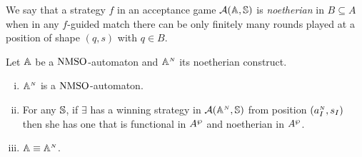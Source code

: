 \begin{definition}\label{def:noetherianstrategy}
We say that a strategy $f$ in an acceptance game $\mathcal{A}(\mathbb{A},\mathbb{S})$ is \emph{noetherian} in $B \subseteq A$ when in any $f$-guided match there can be only finitely many rounds played at a position of shape $(q,s)$ with $q \in B$.
\end{definition}


\begin{proposition}\label{PROP_facts_finConstr} Let $\mathbb{A}$ be a $\mathrm{NMSO}$-automaton and $\mathbb{A}^{{\scriptscriptstyle N}}$ its noetherian construct.
\begin{enumerate}[(i)]
   pt
  \item $\mathbb{A}^{{\scriptscriptstyle N}}$ is a $\mathrm{NMSO}$-automaton.\label{point:finConstrAut}
  \item For any $\mathbb{S}$, if $\exists$ has a winning strategy in $\mathcal{A}(\mathbb{A}^{{\scriptscriptstyle N}},\mathbb{S})$ from position $(a_I^{{\scriptscriptstyle N}},s_I)$ then she has one that is functional in $A^{\wp}$ and noetherian in $A^{\wp}$.%
  \label{point:finConstrStrategy}
  \item $\mathbb{A} \equiv \mathbb{A}^{{\scriptscriptstyle N}}$. \label{point:finConstrEquiv}
  \end{enumerate}
\end{proposition}
